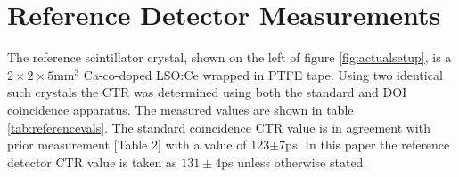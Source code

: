 \section{Reference Detector Measurements}
\label{sec:reference}
The reference scintillator crystal, shown on the left of figure \ref{fig:actualsetup}, is a $2\times2\times5$mm$^3$ Ca-co-doped LSO:Ce wrapped in PTFE tape. Using two identical such crystals the CTR was determined using both the standard and DOI coincidence apparatus. The measured values are shown in table \ref{tab:referencevals}. The standard coincidence CTR value is in agreement with prior measurement [Table 2]\cite{uffray_Jarron_Meyer_Lecoq_2014} with a value of 123$\pm$7ps. In this paper the reference detector CTR value is taken as $131\pm4$ps unless otherwise stated.
